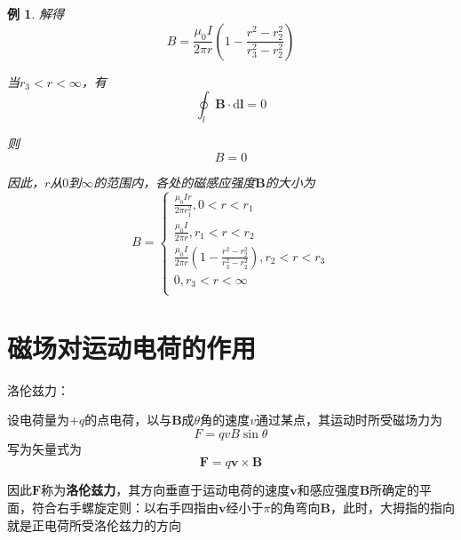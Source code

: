 \documentclass[12pt, a4paper, twoside]{ctexbook}
\newtheorem{example}[theorem]{例}
\begin{document}
\begin{example}
    解得
    $$
    B=\frac{\mu_0 I}{2\pi r}\left(1-\frac{r^2-r_2^2}{r_3^2-r_2^2}\right)
    $$

    当$r_3<r<\infty$，有
    $$
    \oint_l\boldsymbol{B}\cdot\mathrm{d}\boldsymbol{l}=0
    $$
    
    则
    $$
    B=0
    $$

    因此，$r$从$0$到$\infty$的范围内，各处的磁感应强度$\boldsymbol{B}$的大小为
    $$
    B=\left\{ \begin{array}{l}
        \frac{\mu _0Ir}{2\pi r_{1}^{2}},0<r<r_1\\
        \frac{\mu _0I}{2\pi r},r_1<r<r_2\\
        \frac{\mu _0I}{2\pi r}\left( 1-\frac{r^2-r_{2}^{2}}{r_{3}^{2}-r_{2}^{2}} \right) ,r_2<r<r_3\\
        0,r_3<r<\infty\\
    \end{array} \right. 
    $$
\end{example}
\section{磁场对运动电荷的作用}
{\sonti 洛伦兹力}：

设电荷量为$+q$的点电荷，以与$\boldsymbol{B}$成$\theta$角的速度$v$通过某点，其运动时所受磁场力为
$$
F=qvB\sin\theta
$$
写为矢量式为
$$
\boldsymbol{F}=q\boldsymbol{v}\times\boldsymbol{B}
$$

因此$\boldsymbol{F}$称为\textbf{洛伦兹力}，其方向垂直于运动电荷的速度$\boldsymbol{v}$和感应强度$\boldsymbol{B}$所确定的平面，符合右手螺旋定则：以右手四指由$\boldsymbol{v}$经小于$\pi$的角弯向$\boldsymbol{B}$，此时，大拇指的指向就是正电荷所受洛伦兹力的方向
\end{document}
